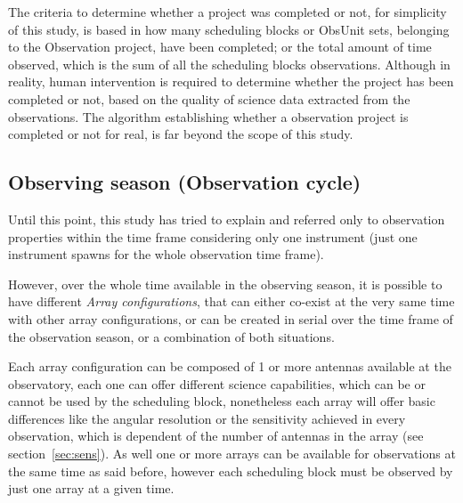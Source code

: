 The criteria to determine whether a project was completed or not, for simplicity of this study, is based in how many scheduling blocks or ObsUnit sets, belonging to the Observation project, have been completed; or the total amount of time observed, which is the sum of all the scheduling blocks observations. Although in reality, human intervention is required to determine whether the project has been completed or not, based on the quality of science data extracted from the observations. The algorithm establishing whether a observation project is completed or not for real, is far beyond the scope of this study. 

\subsection{Observing season (Observation cycle)}
Until this point, this study has tried to explain and referred only to observation properties within the time frame considering only one instrument (just one instrument spawns for the whole observation time frame). 

However, over the whole time available in the observing season, it is possible to have different \textit{Array configurations}, that can either co-exist at the very same time with other array configurations, or can be created in serial over the time frame of the observation season, or a combination of both situations.

Each array configuration can be composed of 1 or more antennas available at the observatory, each one can offer different science capabilities, which can be or cannot be used by the scheduling block, nonetheless each array will offer basic differences like the angular resolution or the sensitivity achieved in every observation, which is dependent of the number of antennas in the array (see section~\ref{sec:sens}). As well one or more arrays can be available for observations at the same time as said before, however each scheduling block must be observed by just one array at a given time.

